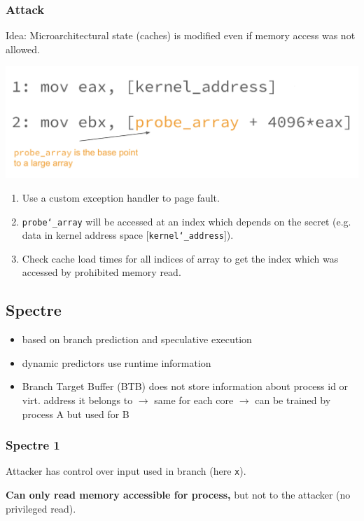 \subsubsection{Attack}
Idea: Microarchitectural state (caches) is modified even if memory access was not allowed.

\begin{center}
    \includegraphics[width=0.8\linewidth]{images/meltdown-cache.png}
\end{center}

\begin{enumerate}
    \item Use a custom exception handler to page fault.
    \item \texttt{probe\char`_array} will be accessed at an index which depends on the
secret (e.g. data in kernel address space $[$\texttt{kernel\char`_address}$]$).
    \item Check cache load times for all indices of array to get the index which was accessed by prohibited memory read.
\end{enumerate}

\subsection{Spectre}
\begin{itemize}
    \item based on branch prediction and speculative execution
    \item dynamic predictors use runtime information
    \item Branch Target Buffer (BTB) does not store information about process id or virt. address it belongs to $\xrightarrow{}$ same for each core $\xrightarrow{}$ can be trained by process A but used for B
\end{itemize}

\subsubsection{Spectre 1}
Attacker has control over input used in branch (here \texttt{x}).

\textbf{Can only read memory accessible for process,} but not to the attacker (no privileged read).

